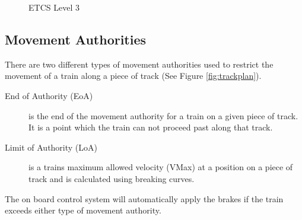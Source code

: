 \begin{center}
\begin{figure}[h!]



 \caption{ETCS Level 3}
\label{fig:ETCSLevel3}
\end{figure}
\end{center}




\subsection*{Movement Authorities}
There are two different types of movement authorities used to restrict the movement of a train along a piece of track (See Figure \ref{fig:trackplan}).
\begin{description}

\item[End of Authority (EoA)] is the end of the movement authority for a train on a given piece of track. It is a point which the train can not proceed past along that track.

\item[Limit of Authority (LoA)]
 is a trains maximum allowed velocity (VMax) at a position on a piece of track and is calculated using breaking curves.

\end{description}

The on board control system will automatically apply the brakes if the train exceeds either type of movement authority.



